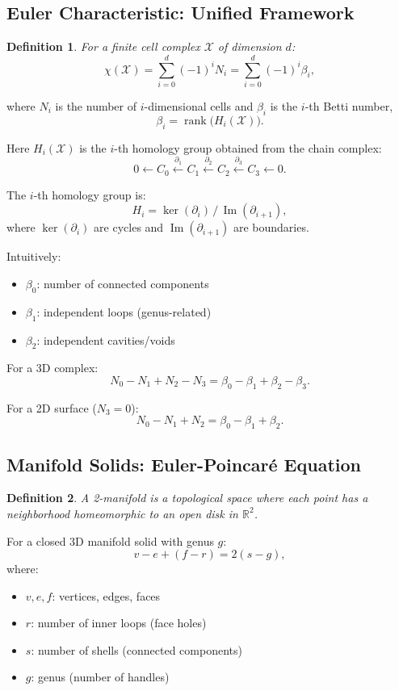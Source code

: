 \documentclass[conference]{IEEEtran}
\newtheorem{definition}{Definition}
\begin{document}
\subsection{Euler Characteristic: Unified Framework}

\begin{definition}
For a finite cell complex $\mathcal{X}$ of dimension $d$:
\[
\chi(\mathcal{X})
= \sum_{i=0}^{d} (-1)^i N_i
= \sum_{i=0}^{d} (-1)^i \beta_i,
\]
\end{definition}
where $N_i$ is the number of $i$-dimensional cells and $\beta_i$ is the $i$-th Betti number,
\[
\beta_i = \operatorname{rank}\bigl(H_i(\mathcal{X})\bigr).
\]

Here $H_i(\mathcal{X})$ is the $i$-th homology group obtained from the chain complex:
\[
0 \leftarrow C_0 \xleftarrow{\partial_1} C_1 \xleftarrow{\partial_2} C_2 
\xleftarrow{\partial_3} C_3 \leftarrow 0.
\]

The $i$-th homology group is:
\[
H_i = \ker(\partial_i)\,/\,\operatorname{Im}(\partial_{i+1}),
\]
where $\ker(\partial_i)$ are cycles and $\operatorname{Im}(\partial_{i+1})$ are boundaries.

Intuitively:
\begin{itemize}
    \item $\beta_0$: number of connected components
    \item $\beta_1$: independent loops (genus-related)
    \item $\beta_2$: independent cavities/voids
\end{itemize}

For a 3D complex:
\[
N_0 - N_1 + N_2 - N_3 = \beta_0 - \beta_1 + \beta_2 - \beta_3.
\]

For a 2D surface ($N_3 = 0$):
\[
N_0 - N_1 + N_2 = \beta_0 - \beta_1 + \beta_2.
\]

\subsection{Manifold Solids: Euler-Poincaré Equation}

\begin{definition}
A 2-manifold is a topological space where each point has a neighborhood homeomorphic to an open disk in $\mathbb{R}^2$.
\end{definition}

For a closed 3D manifold solid with genus $g$:
\[
v - e + (f - r) = 2(s - g),
\]
where:
\begin{itemize}
    \item $v, e, f$: vertices, edges, faces
    \item $r$: number of inner loops (face holes)
    \item $s$: number of shells (connected components)
    \item $g$: genus (number of handles)
\end{itemize}
\end{document}
